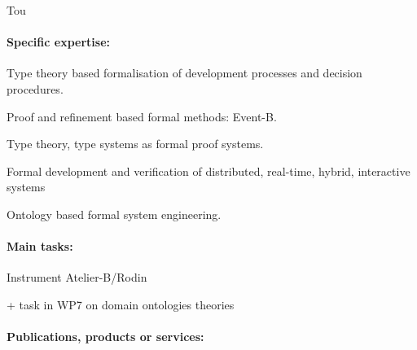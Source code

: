 \begin{sitedescription}{Tou}
\paragraph{Specific expertise:} 
\begin{compactitem}
    \item Type theory based formalisation of development processes and decision procedures. 
	\item Proof and refinement based formal methods: Event-B. 
	\item Type theory, type systems as formal proof systems. 
	\item Formal development and verification of distributed, real-time, hybrid, interactive systems
	\item Ontology based formal system engineering.
\end{compactitem}




\paragraph{Main tasks:}


\begin{compactitem}
\item {} Instrument Atelier-B/Rodin
\item {\color{red} + task in WP7 on domain ontologies theories}

\end{compactitem}

\paragraph{Publications, products or services:}
\begin{compactitem}


\end{compactitem}
\end{sitedescription}
